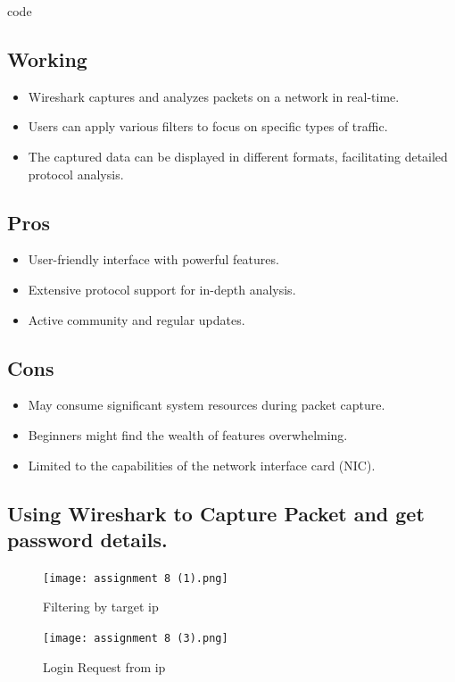 code \documentclass[11pt]{article}
\begin{document}
\subsection{Working}
\begin{itemize}
	\item Wireshark captures and analyzes packets on a network in real-time.
	\item Users can apply various filters to focus on specific types of traffic.
	\item The captured data can be displayed in different formats, facilitating detailed
	      protocol analysis.
\end{itemize}

\subsection{Pros}
\begin{itemize}
	\item User-friendly interface with powerful features.
	\item Extensive protocol support for in-depth analysis.
	\item Active community and regular updates.
\end{itemize}

\subsection{Cons}
\begin{itemize}
	\item May consume significant system resources during packet capture.
	\item Beginners might find the wealth of features overwhelming.
	\item Limited to the capabilities of the network interface card (NIC).
\end{itemize}

\subsection{Using Wireshark to Capture Packet and get password details. }

\begin{figure}[H]
    \centering
    \texttt{[image: assignment 8 (1).png]}
    \caption{Filtering by target ip}
\end{figure}
\begin{figure}[H]
    \centering
    \texttt{[image: assignment 8 (3).png]}
    \caption{Login Request from ip}
\end{figure}
\end{document}
